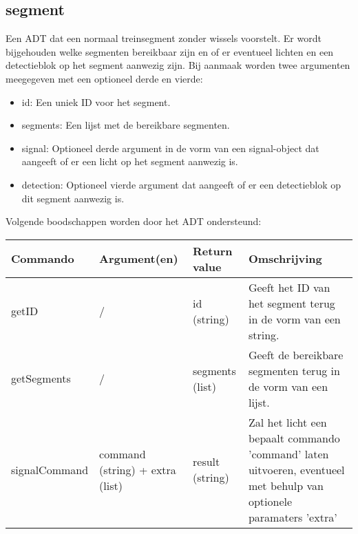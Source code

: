 \documentclass{article}
\begin{document}
\subsection{segment} %
Een ADT dat een normaal treinsegment zonder wissels voorstelt. Er wordt bijgehouden welke segmenten bereikbaar zijn en of er eventueel lichten en een detectieblok op het segment aanwezig zijn. Bij aanmaak worden twee argumenten meegegeven met een optioneel derde en vierde:
\begin{itemize}
  \item id: Een uniek ID voor het segment.
  \item segments: Een lijst met de bereikbare segmenten.
  \item signal: Optioneel derde argument in de vorm van een signal-object dat aangeeft of er een licht op het segment aanwezig is.
  \item detection: Optioneel vierde argument dat aangeeft of er een detectieblok op dit segment aanwezig is.
\end{itemize}
Volgende boodschappen worden door het ADT ondersteund:
\begin{center}
    \begin{tabular}{ | l | l | l | p{6cm} |}
    \hline
    Commando & Argument(en) & Return value & Omschrijving \\ \hline
    getID & / & id (string) & Geeft het ID van het segment terug in de vorm van een string. \\ \hline
    getSegments & / & segments (list) & Geeft de bereikbare segmenten terug in de vorm van een lijst. \\ \hline
    signalCommand & command (string) + extra (list) & result (string) & Zal het licht een bepaalt commando 'command' laten uitvoeren, eventueel met behulp van optionele paramaters 'extra' \\ \hline
    \end{tabular}
\end{center}
\end{document}
